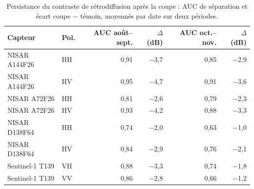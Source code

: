 \begin{table}[htbp]
\centering
\small
\caption{Persistance du contraste de rétrodiffusion après la coupe : AUC de séparation et écart coupe $-$ témoin, moyennés par date sur deux périodes.}
\label{tab-persistence}
\begin{tabular}{llrrrr}
\toprule
Capteur & Pol. & AUC août--sept. & $\Delta$ (dB) & AUC oct.--nov. & $\Delta$ (dB) \\
\midrule
NISAR A144F26 & HH & 0{,}91 & $-$3{,}7 & 0{,}85 & $-$2{,}9 \\
NISAR A144F26 & HV & 0{,}95 & $-$4{,}7 & 0{,}91 & $-$3{,}6 \\
NISAR A72F26 & HH & 0{,}81 & $-$2{,}6 & 0{,}79 & $-$2{,}3 \\
NISAR A72F26 & HV & 0{,}93 & $-$4{,}2 & 0{,}88 & $-$3{,}3 \\
NISAR D138F64 & HH & 0{,}74 & $-$2{,}0 & 0{,}63 & $-$1{,}0 \\
NISAR D138F64 & HV & 0{,}84 & $-$2{,}9 & 0{,}76 & $-$2{,}1 \\
Sentinel-1 T139 & VH & 0{,}88 & $-$3{,}3 & 0{,}74 & $-$1{,}8 \\
Sentinel-1 T139 & VV & 0{,}86 & $-$2{,}8 & 0{,}66 & $-$1{,}2 \\
\bottomrule
\end{tabular}
\end{table}
